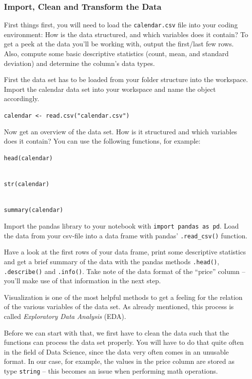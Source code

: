\documentclass[
  11pt,
]{article}
\newenvironment{tips}[1]
  {
  \begin{itemize}
  \footnotesize
  \renewcommand{\labelitemi}{
    \raisebox{-.7\height}[0pt][0pt]{
      {\setkeys{Gin}{width=3em,keepaspectratio}
        \texttt{[image: images/\#1.png]}}
    }
  }
  \setlength{\fboxsep}{1em}
  \begin{rbox}
  \item
  }
  {
  \end{rbox}
  \end{itemize}
  }
\newenvironment{tipsp}[1]
  {
  \begin{itemize}
  \footnotesize
  \renewcommand{\labelitemi}{
    \raisebox{-.7\height}[0pt][0pt]{
      {\setkeys{Gin}{width=3em,keepaspectratio}
        \texttt{[image: images/\#1.png]}}
    }
  }
  \setlength{\fboxsep}{1em}
  \begin{pbox}
  \item
  }
  {
  \end{pbox}
  \end{itemize}
  }
\begin{document}
\hypertarget{import-clean-and-transform-the-data}{%
\subsubsection{Import, Clean and Transform the Data}\label{import-clean-and-transform-the-data}}

First things first, you will need to load the \texttt{calendar.csv} file into your coding environment: How is the data structured, and which variables does it contain? To get a peek at the data you'll be working with, output the first/last few rows. Also, compute some basic descriptive statistics (count, mean, and standard deviation) and determine the column's data types.

\begin{tips}r
First the data set has to be loaded from your folder structure into the workspace. Import the calendar data set into your workspace and name the object accordingly.

\texttt{calendar\ \textless{}-\ read.csv("calendar.csv")}

Now get an overview of the data set. How is it structured and which variables does it contain? You can use the following functions, for example:

\texttt{head(calendar)}\strut \\
\texttt{str(calendar)}\strut \\
\texttt{summary(calendar)}

\end{tips}

\begin{tipsp}p
Import the pandas library to your notebook with \texttt{import\ pandas\ as\ pd}. Load the data from your csv-file into a data frame with pandas' \texttt{.read\_csv()} function.

Have a look at the first rows of your data frame, print some descriptive statistics and get a brief summary of the data with the pandas methods \texttt{.head()}, \texttt{.describe()} and \texttt{.info()}.
Take note of the data format of the ``price'' column -- you'll make use of that information in the next step.

\end{tipsp}

Visualization is one of the most helpful methods to get a feeling for the relation of the various variables of the data set. As already mentioned, this process is called \emph{Exploratory Data Analysis} (EDA).

Before we can start with that, we first have to clean the data such that the functions can process the data set properly. You will have to do that quite often in the field of Data Science, since the data very often comes in an unusable format. In our case, for example, the values in the price column are stored as type \texttt{string} -- this becomes an issue when performing math operations.
\end{document}
